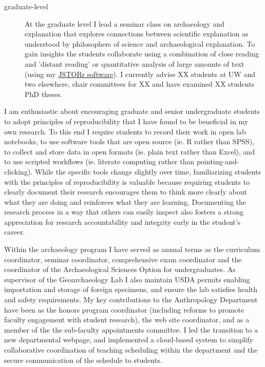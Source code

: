 \documentclass[11pt,article,oneside]{memoir}
\begin{document}
\begin{description}
\item[graduate-level] At the graduate level I lead a seminar class on archaeology and explanation that explores connections between scientific explanation as understood by philosophers of science and archaeological explanation. To gain insights the students collaborate using a combination of close reading and 'distant reading' or quantitative analysis of large amounts of text (using my \href{https://github.com/benmarwick/JSTORr}{JSTORr software}). I currently advise XX students at UW and two elsewhere, chair committees for XX and have examined XX students PhD theses.
  
\end{description}
    
I am enthusiastic about encouraging graduate and senior undergraduate students to adopt principles of reproducibility that I have found to be  beneficial in my own research. To this end I require students to record their work in open lab notebooks, to use software tools that are open source (ie. R rather than SPSS), to collect and store data in open formats (ie. plain text rather than Excel), and to use scripted workflows (ie. literate computing rather than pointing-and-clicking).  While the specific tools change slightly over time, familiarizing students with the principles of reproducibility is valuable because requiring students to clearly document their research encourages them to think more clearly about what they are doing and reinforces what they are learning. Documenting the research process in a way that others can easily inspect also fosters a strong appreciation for research accountability and integrity early in the student's career. 

\bigskip     


Within the archaeology program I have served as annual terms as the curriculum coordinator, seminar coordinator, comprehensive exam coordinator and the coordinator of the Archaeological Sciences Option for undergraduates. As supervisor of the Geoarchaeology Lab I also maintain USDA permits enabling importation and storage of foreign specimens, and ensure the lab satisfies health and safety requirements. My key contributions to the Anthropology Department have been as the honors program coordinator (including reforms to promote faculty engagement with student research), the web site coordinator, and as a member of the the sub-faculty appointments committee. I led the transition to a new departmental webpage, and implemented a cloud-based system to simplify collaborative coordination of teaching scheduling within the department and the secure communication of the schedule to students. 
\end{document}
